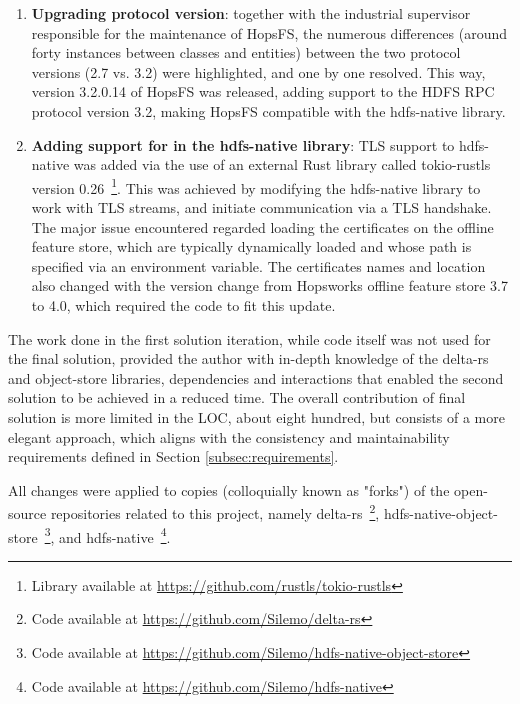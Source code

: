\begin{enumerate}
  \item \textbf{Upgrading  protocol version}: together with the industrial supervisor responsible for the maintenance of \gls{HopsFS}, the numerous differences (around forty instances between classes and entities) between the two protocol versions (2.7 vs. 3.2) were highlighted, and one by one resolved. This way, version 3.2.0.14 of \gls{HopsFS} was released, adding support to the \gls{HDFS} \gls{RPC} protocol version 3.2, making \gls{HopsFS} compatible with the hdfs-native library.
  \item \textbf{Adding support for  in the hdfs-native library}: \gls{TLS} support to hdfs-native was added via the use of an external Rust library called tokio-rustls version 0.26~\footnote{Library available at \url{https://github.com/rustls/tokio-rustls}}. This was achieved by modifying the hdfs-native library to work with \gls{TLS} streams, and initiate communication via a \gls{TLS} handshake. The major issue encountered regarded loading the certificates on the offline feature store, which are typically dynamically loaded and whose path is specified via an environment variable. The certificates names and location also changed with the version change from Hopsworks offline feature store 3.7 to 4.0, which required the code to fit this update.
\end{enumerate}

The work done in the first solution iteration, while code itself was not used for the final solution, provided the author with in-depth knowledge of the delta-rs and object-store libraries, dependencies and interactions that enabled the second solution to be achieved in a reduced time. The overall contribution of final solution is more limited in the \gls{LOC}, about eight hundred, but consists of a more elegant approach, which aligns with the consistency and maintainability requirements defined in Section \ref{subsec:requirements}.

All changes were applied to copies (colloquially known as "forks") of the open-source repositories related to this project, namely delta-rs~\footnote{Code available at \url{https://github.com/Silemo/delta-rs}}, hdfs-native-object-store~\footnote{Code available at \url{https://github.com/Silemo/hdfs-native-object-store}}, and hdfs-native~\footnote{Code available at \url{https://github.com/Silemo/hdfs-native}}.